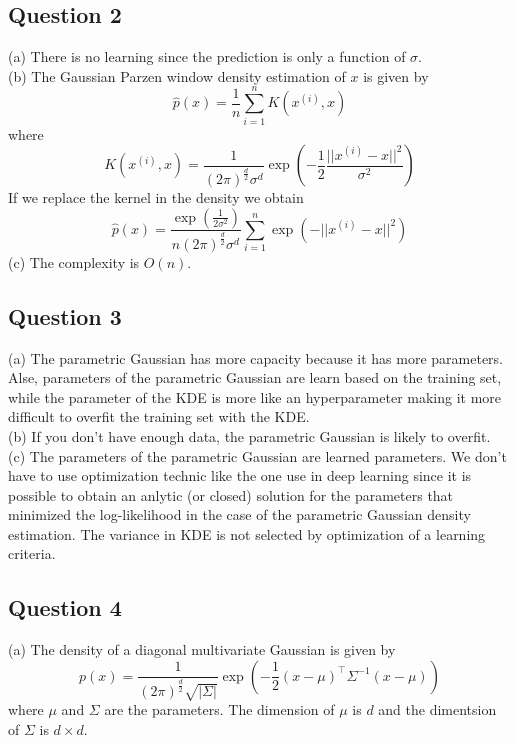\documentclass[12pt]{article}
\begin{document}
\subsection*{Question 2}
(a) There is no learning since the prediction is only a function of $\sigma$.\\

(b) The Gaussian Parzen window density estimation of $x$ is given by 
$$
    \hat{p}(x) = \frac{1}{n}\sum_{i=1}^n K(x^{(i)}, x)
$$
where 
$$
K(x^{(i)}, x) =
\frac{1}{(2\pi)^\frac{d}{2}\sigma^d}
\exp\left(-\frac{1}{2}\frac{||x^{(i)}-x||^2}{\sigma^2}\right)
$$
If we replace the kernel in the density we obtain
$$
\hat{p}(x) = \frac{\exp(\frac{1}{2\sigma^2})}{n(2\pi)^\frac{d}{2}\sigma^d}\sum_{i=1}^n
\exp\left(-||x^{(i)}-x||^2\right)
$$
(c) The complexity is $O(n)$. \\

\subsection*{Question 3}
(a) The parametric Gaussian has more capacity because it has more parameters. Alse, parameters of the parametric Gaussian are learn based on the training set, while the parameter of the KDE is more like an hyperparameter making it more difficult to overfit the training set with the KDE.\\

(b) If you don't have enough data, the parametric Gaussian is likely to overfit.\\

(c) The parameters of the parametric Gaussian are learned parameters. We don't have to use optimization technic like the one use in deep learning since it is possible to obtain an anlytic (or closed) solution for the parameters that minimized the log-likelihood in the case of the parametric Gaussian density estimation. The variance in KDE is not selected by optimization of a learning criteria.

\subsection*{Question 4}
(a) The density of a diagonal multivariate Gaussian is given by
\begin{equation}
p(x) 
= \frac{1}{(2\pi)^\frac{d}{2}\sqrt{|\Sigma|}}
\exp\left(
   - \frac{1}{2}(x-\mu)^\top\Sigma^{-1}(x-\mu)
\right)
\label{eq:diag_normal}
\end{equation}
where $\mu$ and $\Sigma$ are the parameters. The dimension of $\mu$ is $d$ and the dimentsion of $\Sigma$ is $d\times d$.\\
\end{document}
